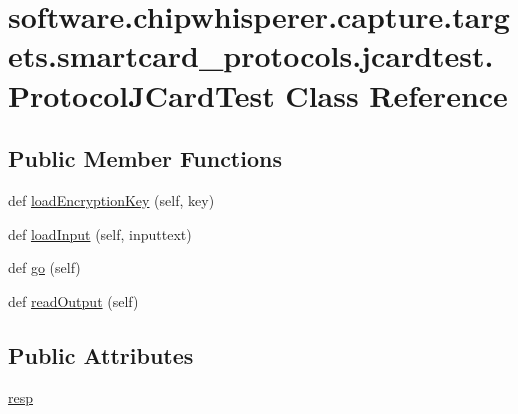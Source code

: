 \hypertarget{classsoftware_1_1chipwhisperer_1_1capture_1_1targets_1_1smartcard__protocols_1_1jcardtest_1_1ProtocolJCardTest}{}\section{software.\+chipwhisperer.\+capture.\+targets.\+smartcard\+\_\+protocols.\+jcardtest.\+Protocol\+J\+Card\+Test Class Reference}
\label{classsoftware_1_1chipwhisperer_1_1capture_1_1targets_1_1smartcard__protocols_1_1jcardtest_1_1ProtocolJCardTest}
\subsection*{Public Member Functions}
\begin{DoxyCompactItemize}
\item 
def \hyperlink{classsoftware_1_1chipwhisperer_1_1capture_1_1targets_1_1smartcard__protocols_1_1jcardtest_1_1ProtocolJCardTest_aecf021021fc1806d70f664846ade682e}{load\+Encryption\+Key} (self, key)
\item 
def \hyperlink{classsoftware_1_1chipwhisperer_1_1capture_1_1targets_1_1smartcard__protocols_1_1jcardtest_1_1ProtocolJCardTest_ada8c20654b8c0405a9348ce22730262d}{load\+Input} (self, inputtext)
\item 
def \hyperlink{classsoftware_1_1chipwhisperer_1_1capture_1_1targets_1_1smartcard__protocols_1_1jcardtest_1_1ProtocolJCardTest_a704a78b04c2fa14f79e8e0f791ae1da9}{go} (self)
\item 
def \hyperlink{classsoftware_1_1chipwhisperer_1_1capture_1_1targets_1_1smartcard__protocols_1_1jcardtest_1_1ProtocolJCardTest_a99cf50c93a51f3285a2f9e51f1d2d20f}{read\+Output} (self)
\end{DoxyCompactItemize}
\subsection*{Public Attributes}
\begin{DoxyCompactItemize}
\item 
\hyperlink{classsoftware_1_1chipwhisperer_1_1capture_1_1targets_1_1smartcard__protocols_1_1jcardtest_1_1ProtocolJCardTest_aa9ebbb3ebad5108bd2f41b17fcadee91}{resp}
\end{DoxyCompactItemize}


